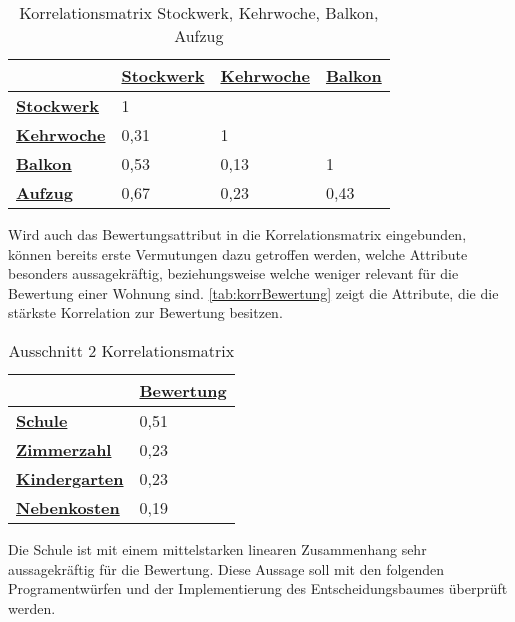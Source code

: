 \useunder{\uline}{\ul}{}
\begin{table}[h]
    \begin{center}
        \begin{tabular}{|l|l|l|l|}
        \hline
            {\ul \textbf{}}              & {\ul \textbf{Stockwerk}} & {\ul \textbf{Kehrwoche}}  & {\ul \textbf{Balkon}} \\ \hline
            {\ul \textbf{Stockwerk}}     & 1                        &                           &                       \\ \hline
            {\ul \textbf{Kehrwoche}}     & 0,31                     & 1                         &                       \\ \hline
            {\ul \textbf{Balkon}}        & 0,53                     & 0,13                      & 1                     \\ \hline
            {\ul \textbf{Aufzug}}        & 0,67                     & 0,23                      & 0,43                  \\ \hline
        \end{tabular}
        \caption{Korrelationsmatrix Stockwerk, Kehrwoche, Balkon, Aufzug}
        \label{tab:korr2}
    \end{center}
\end{table}
 
Wird auch das Bewertungsattribut in die Korrelationsmatrix eingebunden, können bereits erste Vermutungen dazu getroffen werden, 
welche Attribute besonders aussagekräftig, beziehungsweise welche weniger relevant für die Bewertung einer Wohnung sind. 
\autoref{tab:korrBewertung} zeigt die Attribute, die die stärkste Korrelation zur Bewertung besitzen.
\useunder{\uline}{\ul}{}
\begin{table}[h]
    \begin{center}
        \begin{tabular}{|l|l|}
            \hline
            {\ul \textbf{}}              & {\ul \textbf{Bewertung}} \\ \hline
            {\ul \textbf{Schule}}        & 0,51                        \\ \hline
            {\ul \textbf{Zimmerzahl}}    & 0,23                     \\ \hline
            {\ul \textbf{Kindergarten}}  & 0,23                     \\ \hline
            {\ul \textbf{Nebenkosten}}   & 0,19                     \\ \hline
        \end{tabular}
        \caption{Ausschnitt 2 Korrelationsmatrix}
        \label{tab:korrBewertung}
    \end{center}
\end{table}

Die Schule ist mit einem mittelstarken linearen Zusammenhang sehr aussagekräftig für die Bewertung.
Diese Aussage soll mit den folgenden Programentwürfen und der Implementierung des Entscheidungsbaumes
überprüft werden. 